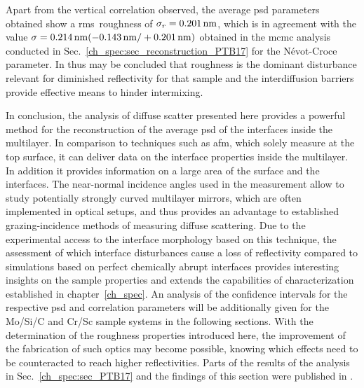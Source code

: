 Apart from the vertical correlation observed, the average \gls{psd} parameters obtained show a \gls{rms}~roughness of $\sigma_r=\nm{0.201}$, which is in agreement with the value $\sigma = \nm{0.214} (-\nm{0.143} / +\nm{0.201})$ obtained in the \gls{mcmc} analysis conducted in Sec.~\ref{ch_spec:sec_reconstruction_PTB17} for the N\'{e}vot-Croce parameter. In thus may be concluded that roughness is the dominant disturbance relevant for diminished reflectivity for that sample and the interdiffusion barriers provide effective means to hinder intermixing.

In conclusion, the analysis of diffuse scatter presented here provides a powerful method for the reconstruction of the average \gls{psd} of the interfaces inside the multilayer. In comparison to techniques such as \gls{afm}, which solely measure at the top surface, it can deliver data on the interface properties inside the multilayer. In addition it provides information on a large area of the surface and the interfaces. The near-normal incidence angles used in the measurement allow to study potentially strongly curved multilayer mirrors, which are often implemented in optical setups, and thus provides an advantage to established grazing-incidence methods of measuring diffuse scattering. Due to the experimental access to the interface morphology based on this technique, the assessment of which interface disturbances cause a loss of reflectivity compared to simulations based on perfect chemically abrupt interfaces provides interesting insights on the sample properties and extends the capabilities of characterization established in chapter~\ref{ch_spec}. An analysis of the confidence intervals for the respective \gls{psd} and correlation parameters will be additionally given for the Mo/Si/C and Cr/Sc sample systems in the following sections. With the determination of the roughness properties introduced here, the improvement of the fabrication of such optics may become possible, knowing which effects need to be counteracted to reach higher reflectivities. Parts of the results of the analysis in Sec.~\ref{ch_spec:sec_PTB17} and the findings of this section were published in .

